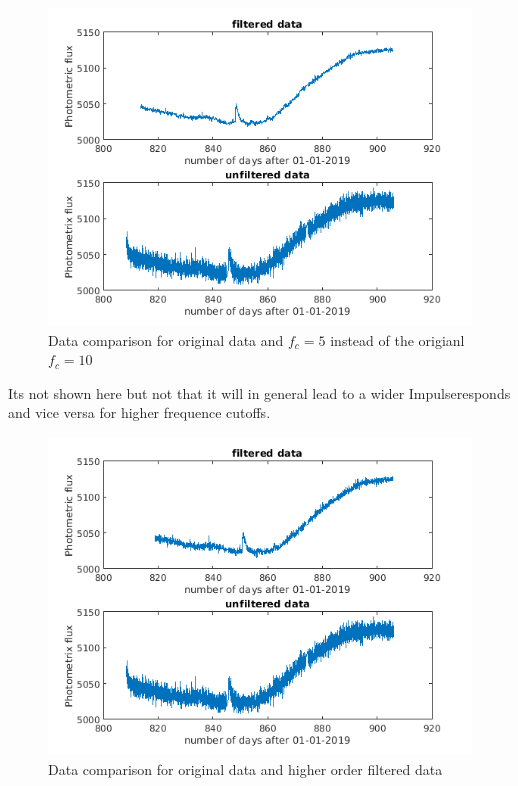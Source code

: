 \begin{figure}[h]
  \centering
  \includegraphics[scale=0.60]{matlabStuff/FIR20CutOff.png}
  \caption{Data comparison for original data and $f_{c}=5$ instead of the origianl $f_c = 10$}%
  \label{fig:resultingTransferFuntion20cutoff}
\end{figure}

Its not shown here but not that it will in general lead to a
wider Impulseresponds and vice versa for higher frequence cutoffs.

\begin{figure}[h]
  \centering
  \includegraphics[scale=0.60]{matlabStuff/datasetHigherOrder.png}
  \caption{Data comparison for original data and higher order filtered data}%
  \label{fig:resultingTransferFuntion20cutoff}
\end{figure}

